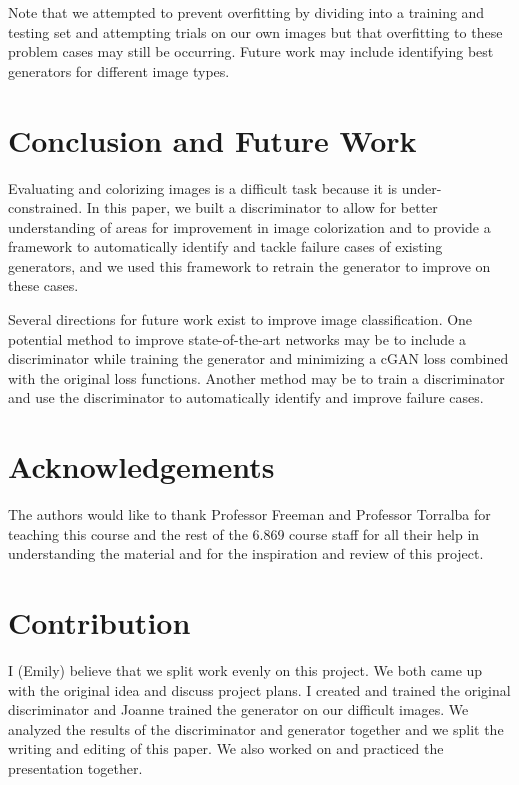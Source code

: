 \documentclass[10pt,twocolumn,letterpaper]{article}
\begin{document}
Note that we attempted to prevent overfitting by dividing into a training and testing set and attempting trials on our own images but that overfitting to these problem cases may still be occurring. Future work may include identifying best generators for different image types. 

\section{Conclusion and Future Work}

Evaluating and colorizing images is a difficult task because it is under-constrained. In this paper, we built a discriminator to allow for better understanding of areas for improvement in image colorization and to provide a framework to automatically identify and tackle failure cases of existing generators, and we used this framework to retrain the generator to improve on these cases. 

Several directions for future work exist to improve image classification. One potential method to improve state-of-the-art networks may be to include a discriminator while training the generator and minimizing a cGAN loss combined with the original loss functions. Another method may be to train a discriminator and use the discriminator to automatically identify and improve failure cases. 

\section{Acknowledgements}

The authors would like to thank Professor Freeman and Professor Torralba for teaching this course and the rest of the 6.869 course staff for all their help in understanding the material and for the inspiration and review of this project.

\section{Contribution}

I (Emily) believe that we split work evenly on this project. We both came up with the original idea and discuss project plans. I created and trained the original discriminator and Joanne trained the generator on our difficult images. We analyzed the results of the discriminator and generator together and we split the writing and editing of this paper. We also worked on and practiced the presentation together.
\end{document}
